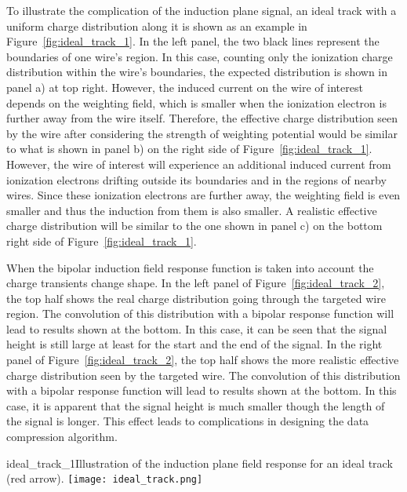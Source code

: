 To illustrate the complication of the induction plane signal,  
an ideal track with a uniform charge distribution along it %
is shown as 
an example in Figure~\ref{fig:ideal_track_1}. In the left panel, the 
two black lines represent the boundaries of one wire's region. In this case,  
counting only the ionization charge distribution within the wire's boundaries,
the expected 
distribution is shown in panel a) at top right.  However, the induced current on the wire of 
interest depends on the weighting field, which is smaller when the ionization electron is 
further away from the wire itself. Therefore, the effective charge distribution seen by 
the wire after considering the strength of weighting potential 
 would be similar to what is shown in panel b) on the right side of 
Figure~\ref{fig:ideal_track_1}. 
However, the wire of interest will experience an 
additional induced current from ionization electrons 
drifting outside its boundaries and in the regions of nearby wires. 
Since these ionization electrons are further away, 
the weighting field is even smaller and thus the induction from them is 
also smaller. A realistic effective charge distribution will be similar to the one shown in panel c) on 
the bottom right side of Figure~\ref{fig:ideal_track_1}. 


When the bipolar induction field response function is taken into account the 
charge transients change shape.
In the left panel of Figure~\ref{fig:ideal_track_2}, the top half shows 
the real charge distribution going through the targeted wire region. The convolution of this 
distribution with a bipolar response function will lead to results shown at the bottom. In this 
case, it can be seen that the signal height is still large at least for the start and the end of the 
signal. In the right panel of Figure~\ref{fig:ideal_track_2}, the top half shows the more 
realistic effective charge distribution seen by the targeted wire. The convolution of this 
distribution with a bipolar response function will lead to results shown at the bottom. In 
this case, it is apparent that the signal height is much smaller though the length of the signal is 
longer. This effect leads to complications in designing the data compression algorithm.

\begin{cdrfigure}{ideal_track_1}{Illustration of the induction plane field response for an ideal track (red arrow).}
  \texttt{[image: ideal\_track.png]}
\end{cdrfigure}

